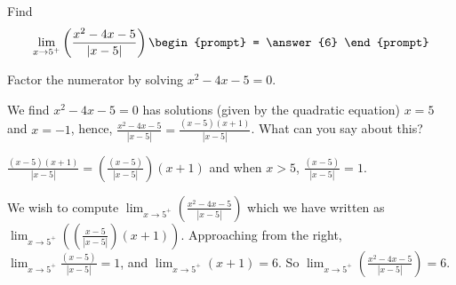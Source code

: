 \documentclass{ximera}
\author{Matthew Carr}
\begin{document}
\begin{exercise}



Find
\[
\lim_{x\to5^{+}}\left(\frac{x^2-4x-5}{\left|x-5\right|}\right)
\begin{prompt}
= \answer{6}
\end{prompt}
\]

\begin{hint}
Factor the numerator by solving $x^2-4x-5=0$.
\end{hint}
\begin{hint}
We find $x^2-4x-5=0$ has solutions (given by the quadratic equation) $x=5$ and $x=-1$, hence, $\frac{x^2-4x-5}{\left|x-5\right|}=\frac{(x-5)(x+1)}{\left|x-5\right|}$. What can you say about this?
\end{hint}
\begin{hint}
$\frac{(x-5)(x+1)}{\left|x-5\right|}=\left(\frac{(x-5)}{\left|x-5\right|}\right)(x+1)$ and when $x>5$, $\frac{(x-5)}{\left|x-5\right|}=1$. 
\end{hint}
\begin{hint}
We wish to compute $\lim_{x\to5^{+}}\left(\frac{x^2-4x-5}{\left|x-5\right|}\right)$ which we have written as $\lim_{x\to5^{+}}\left(\left(\frac{x-5}{\left|x-5\right|}\right)(x+1)\right)$. Approaching from the right, $\lim_{x\to5^{+}}\frac{(x-5)}{\left|x-5\right|}=1$, and $\lim_{x\to5^{+}}\left(x+1\right)=6$. So $\lim_{x\to5^{+}}\left(\frac{x^2-4x-5}{\left|x-5\right|}\right)=6$.
\end{hint}
\end{exercise}
\end{document}
